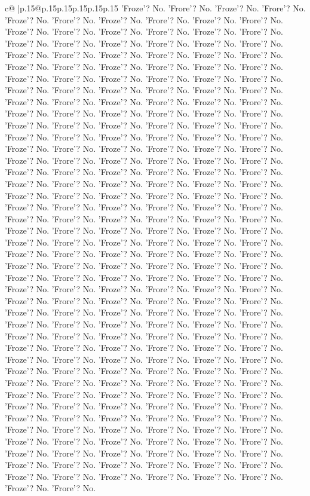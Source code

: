 \documentclass{article}
\begin{document}
{\begin{supertabular}{c@{$\;$}|p{.15\linewidth}@{}p{.15\linewidth}p{.15\linewidth}p{.15\linewidth}p{.15\linewidth}p{.15\linewidth}}
{{{'Froze'? No. 'Frore'? No. 'Froze'? No. 'Frore'? No. 'Froze'? No. 'Frore'? No. 'Froze'? No. 'Frore'? No. 'Froze'? No. 'Frore'? No. 'Froze'? No. 'Frore'? No. 'Froze'? No. 'Frore'? No. 'Froze'? No. 'Frore'? No. 'Froze'? No. 'Frore'? No. 'Froze'? No. 'Frore'? No. 'Froze'? No. 'Frore'? No. 'Froze'? No. 'Frore'? No. 'Froze'? No. 'Frore'? No. 'Froze'? No. 'Frore'? No. 'Froze'? No. 'Frore'? No. 'Froze'? No. 'Frore'? No. 'Froze'? No. 'Frore'? No. 'Froze'? No. 'Frore'? No. 'Froze'? No. 'Frore'? No. 'Froze'? No. 'Frore'? No. 'Froze'? No. 'Frore'? No. 'Froze'? No. 'Frore'? No. 'Froze'? No. 'Frore'? No. 'Froze'? No. 'Frore'? No. 'Froze'? No. 'Frore'? No. 'Froze'? No. 'Frore'? No. 'Froze'? No. 'Frore'? No. 'Froze'? No. 'Frore'? No. 'Froze'? No. 'Frore'? No. 'Froze'? No. 'Frore'? No. 'Froze'? No. 'Frore'? No. 'Froze'? No. 'Frore'? No. 'Froze'? No. 'Frore'? No. 'Froze'? No. 'Frore'? No. 'Froze'? No. 'Frore'? No. 'Froze'? No. 'Frore'? No. 'Froze'? No. 'Frore'? No. 'Froze'? No. 'Frore'? No. 'Froze'? No. 'Frore'? No. 'Froze'? No. 'Frore'? No. 'Froze'? No. 'Frore'? No. 'Froze'? No. 'Frore'? No. 'Froze'? No. 'Frore'? No. 'Froze'? No. 'Frore'? No. 'Froze'? No. 'Frore'? No. 'Froze'? No. 'Frore'? No. 'Froze'? No. 'Frore'? No. 'Froze'? No. 'Frore'? No. 'Froze'? No. 'Frore'? No. 'Froze'? No. 'Frore'? No. 'Froze'? No. 'Frore'? No. 'Froze'? No. 'Frore'? No. 'Froze'? No. 'Frore'? No. 'Froze'? No. 'Frore'? No. 'Froze'? No. 'Frore'? No. 'Froze'? No. 'Frore'? No. 'Froze'? No. 'Frore'? No. 'Froze'? No. 'Frore'? No. 'Froze'? No. 'Frore'? No. 'Froze'? No. 'Frore'? No. 'Froze'? No. 'Frore'? No. 'Froze'? No. 'Frore'? No. 'Froze'? No. 'Frore'? No. 'Froze'? No. 'Frore'? No. 'Froze'? No. 'Frore'? No. 'Froze'? No. 'Frore'? No. 'Froze'? No. 'Frore'? No. 'Froze'? No. 'Frore'? No. 'Froze'? No. 'Frore'? No. 'Froze'? No. 'Frore'? No. 'Froze'? No. 'Frore'? No. 'Froze'? No. 'Frore'? No. 'Froze'? No. 'Frore'? No. 'Froze'? No. 'Frore'? No. 'Froze'? No. 'Frore'? No. 'Froze'? No. 'Frore'? No. 'Froze'? No. 'Frore'? No. 'Froze'? No. 'Frore'? No. 'Froze'? No. 'Frore'? No. 'Froze'? No. 'Frore'? No. 'Froze'? No. 'Frore'? No. 'Froze'? No. 'Frore'? No. 'Froze'? No. 'Frore'? No. 'Froze'? No. 'Frore'? No. 'Froze'? No. 'Frore'? No. 'Froze'? No. 'Frore'? No. 'Froze'? No. 'Frore'? No. 'Froze'? No. 'Frore'? No. 'Froze'? No. 'Frore'? No. 'Froze'? No. 'Frore'? No. 'Froze'? No. 'Frore'? No. 'Froze'? No. 'Frore'? No. 'Froze'? No. 'Frore'? No. 'Froze'? No. 'Frore'? No. 'Froze'? No. 'Frore'? No. 'Froze'? No. 'Frore'? No. 'Froze'? No. 'Frore'? No. 'Froze'? No. 'Frore'? No. 'Froze'? No. 'Frore'? No. 'Froze'? No. 'Frore'? No. 'Froze'? No. 'Frore'? No. 'Froze'? No. 'Frore'? No. 'Froze'? No. 'Frore'? No. 'Froze'? No. 'Frore'? No. 'Froze'? No. 'Frore'? No. 'Froze'? No. 'Frore'? No. 'Froze'? No. 'Frore'? No. 'Froze'? No. 'Frore'? No. 'Froze'? No. 'Frore'? No. 'Froze'? No. 'Frore'? No. 'Froze'? No. 'Frore'? No. 'Froze'? No. 'Frore'? No. 'Froze'? No. 'Frore'? No. 'Froze'? No. 'Frore'? No. 'Froze'? No. 'Frore'? No. 'Froze'? No. 'Frore'? No. 'Froze'? No. 'Frore'? No. 'Froze'? No. 'Frore'? No. 'Froze'? No. 'Frore'? No. 'Froze'? No. 'Frore'? No. 'Froze'? No. 'Frore'? No. 'Froze'? No. 'Frore'? No. 'Froze'? No. 'Frore'? No. }}}
\end{supertabular}}
\end{document}
